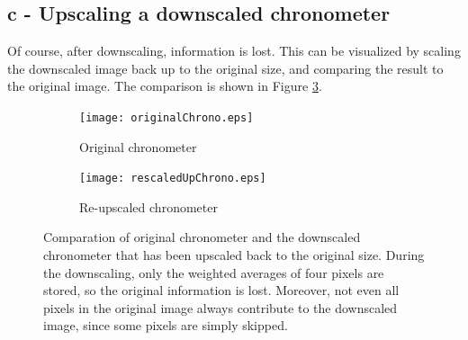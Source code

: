 \subsection*{c - Upscaling a downscaled chronometer}
Of course, after downscaling, information is lost. This can be visualized by scaling the downscaled image back up to the original size, and comparing the result to the original image. The comparison is shown in Figure \ref{fig:chrono_compare}.

\begin{figure}[!Htb]
\centering
 \begin{subfigure}[b]{0.45\textwidth}
  \texttt{[image: originalChrono.eps]}
  \caption{Original chronometer}
  \label{fig:chrono_original}
 \end{subfigure}
 \begin{subfigure}[b]{0.45\textwidth}
  \texttt{[image: rescaledUpChrono.eps]}
  \caption{Re-upscaled chronometer}
  \label{fig:chrono_down_up}
 \end{subfigure}
 \caption{Comparation of original chronometer and the downscaled chronometer that has been upscaled back to the original size. During the downscaling, only the weighted averages of four pixels are stored, so the original information is lost. Moreover, not even all pixels in the original image always contribute to the downscaled image, since some pixels are simply skipped.}
 \label{fig:chrono_compare}
\end{figure}

\clearpage